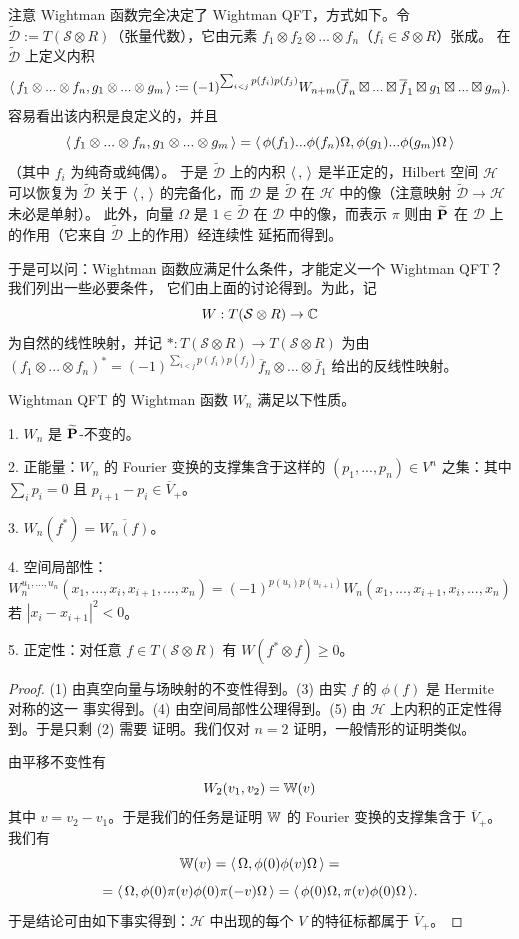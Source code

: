 注意 Wightman 函数完全决定了 Wightman QFT，方式如下。令
$\widetilde{\mathcal D}:=T(\mathcal S\otimes R)$（张量代数），它由元素
$f_1\otimes f_2\otimes...\otimes f_n$（$f_i\in \mathcal S\otimes R$）张成。
在 $\widetilde{\mathcal D}$ 上定义内积
$$
\la f_1\otimes...\otimes f_n, g_1\otimes...\otimes g_m\ra:=(-1)^{\sum_{i<j}p(f_i)p(f_j)}W_{n+m}(\overline f_n\boxtimes...\boxtimes\overline f_1\boxtimes g_1\boxtimes...\boxtimes g_m).
$$
容易看出该内积是良定义的，并且
$$
\la f_1\otimes...\otimes f_n, g_1\otimes...\otimes g_m\ra=\la \phi(f_1)...\phi(f_n)\Omega, \phi(g_1)...\phi(g_m)\Omega\ra
$$
（其中 $f_i$ 为纯奇或纯偶）。
于是 $\widetilde{\mathcal D}$ 上的内积 $\la,\ra$ 是半正定的，Hilbert 空间 $\mathcal H$ 可以恢复为
$\widetilde{\mathcal D}$ 关于 $\la,\ra$ 的完备化，而 $\mathcal D$ 是 $\widetilde{\mathcal D}$ 在
$\mathcal H$ 中的像（注意映射 $\widetilde{\mathcal D}\to \mathcal H$ 未必是单射）。
此外，向量 $\Omega$ 是 $1\in \widetilde{\mathcal D}$ 在 $\mathcal D$ 中的像，而表示 $\pi$ 则由
$\widetilde{\bold P}$ 在 $\mathcal D$ 上的作用（它来自 $\widetilde {\mathcal D}$ 上的作用）经连续性
延拓而得到。

于是可以问：Wightman 函数应满足什么条件，才能定义一个 Wightman QFT？我们列出一些必要条件，
它们由上面的讨论得到。为此，记
$$
W: T(\mathcal S\otimes R)\to \Bbb C
$$ 
为自然的线性映射，并记 $*: T(\mathcal S\otimes R)\to T(\mathcal S\otimes R)$ 为由
$(f_1\otimes...\otimes f_n)^*=(-1)^{\sum_{i<j}p(f_i)p(f_j)}\overline f_n\otimes...\otimes \overline f_1$
给出的反线性映射。

\begin{proposition}\label{cond15} Wightman QFT 的 Wightman 函数 $W_n$ 满足以下性质。

1. $W_n$ 是 $\widetilde{\bold P}$-不变的。

2. 正能量：$W_n$ 的 Fourier 变换的支撑集含于这样的 $(p_1,...,p_n)\in V^n$ 之集：其中
$\sum_i p_i=0$ 且 $p_{i+1}-p_i\in \overline V_+$。

3. $W_n(f^*)=\overline{W_n(f)}$。

4. 空间局部性：
$$
W_n^{u_1,...,u_n}(x_1,...,x_i,x_{i+1},...,x_n)=(-1)^{p(u_i)p(u_{i+1})}W_n(x_1,...,x_{i+1},x_{i},...,x_n)
$$
 若 $|x_i-x_{i+1}|^2<0$。

5. 正定性：对任意 $f\in T(\mathcal S\otimes R)$ 有 $W(f^*\otimes f)\ge 0$。
\end{proposition} 

\begin{proof} (1) 由真空向量与场映射的不变性得到。(3) 由实 $f$ 的 $\phi(f)$ 是 Hermite 对称的这一
事实得到。(4) 由空间局部性公理得到。(5) 由 $\mathcal H$ 上内积的正定性得到。于是只剩 (2) 需要
证明。我们仅对 $n=2$ 证明，一般情形的证明类似。

由平移不变性有
$$
W_2(v_1,v_2)=\Bbb W(v)
$$ 
其中 $v=v_2-v_1$。于是我们的任务是证明 $\Bbb W$ 的 Fourier 变换的支撑集含于 $\overline V_+$。
我们有
$$
\Bbb W(v)=\la \Omega,\phi(0)\phi(v)\Omega\ra=
$$
$$
=\la \Omega,\phi(0)\pi(v)\phi(0)\pi(-v)\Omega\ra=
\la \phi(0)\Omega,\pi(v)\phi(0)\Omega\ra.
$$
于是结论可由如下事实得到：$\mathcal H$ 中出现的每个 $V$ 的特征标都属于 $\overline V_+$。
\end{proof} 

